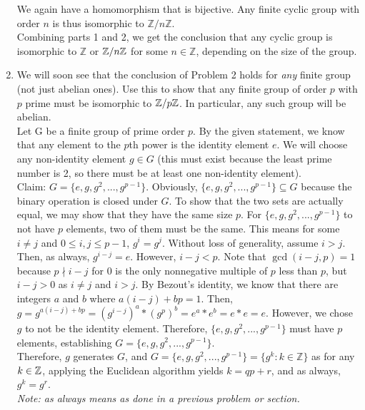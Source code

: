 \documentclass{amsart}
\begin{document}
\begin{enumerate}[itemsep=0.4in]
We again have a homomorphism that is bijective. Any finite cyclic group with order $n$ is thus isomorphic to $\mathbb{Z}/n\mathbb{Z}$.\\

Combining parts 1 and 2, we get the conclusion that any cyclic group is isomorphic to $\mathbb{Z}$ or $\mathbb{Z}/n\mathbb{Z}$ for some $n\in\mathbb{Z}$, depending on the size of the group.


\item We will soon see that the conclusion of Problem 2 holds for \emph{any} finite group (not just abelian ones). Use this to show that any finite group of order $p$ with $p$ prime must be isomorphic to $\mathbb{Z}/p\mathbb{Z}$. In particular, any such group will be abelian.\\

Let G be a finite group of prime order $p$. By the given statement, we know that any element to the $p$th power is the identity element $e$. We will choose any non-identity element $g\in G$ (this must exist because the least prime number is 2, so there must be at least one non-identity element).\\

Claim: $G=\{e,g,g^2,...,g^{p-1}\}$. Obviously, $\{e,g,g^2,...,g^{p-1}\}\subseteq G$ because the binary operation is closed under $G$. To show that the two sets are actually equal, we may show that they have the same size $p$. For $\{e,g,g^2,...,g^{p-1}\}$ to not have $p$ elements, two of them must be the same. This means for some $i\neq j$ and $0\leq i,j\leq p-1$, $g^i=g^j$. Without loss of generality, assume $i>j$. Then, as always, $g^{i-j}=e$. However, $i-j<p$. Note that $\gcd(i-j,p)=1$ because $p\nmid i-j$ for $0$ is the only nonnegative multiple of $p$ less than $p$, but $i-j>0$ as $i\neq j$ and $i>j$. By Bezout's identity, we know that there are integers $a$ and $b$ where $a(i-j)+bp=1$. Then, $g=g^{a(i-j)+bp}=(g^{i-j})^a*(g^p)^b=e^a*e^b=e*e=e$. However, we chose $g$ to not be the identity element. Therefore, $\{e,g,g^2,...,g^{p-1}\}$ must have $p$ elements, establishing $G=\{e,g,g^2,...,g^{p-1}\}$.\\

Therefore, $g$ generates $G$, and $G=\{e,g,g^2,...,g^{p-1}\}=\{g^k:k\in\mathbb{Z}\}$ as for any $k\in\mathbb{Z}$, applying the Euclidean algorithm yields $k=qp+r$, and as always, $g^k=g^r$.\\

\emph{Note: as always means as done in a previous problem or section.}\\


\end{enumerate}
\end{document}
